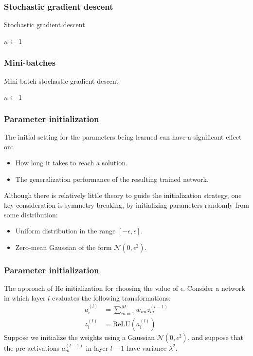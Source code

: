 \documentclass{beamer}
\begin{document}
\begin{frame}
    \frametitle{Stochastic gradient descent}
    \begin{algorithm}[H]
        \caption{Stochastic gradient descent}
        $n\gets{}1$\;
        \;
    \end{algorithm}
\end{frame}

\begin{frame}
    \frametitle{Mini-batches}
    \begin{algorithm}[H]
        \caption{Mini-batch stochastic gradient descent}
        $n\gets{}1$\;
        \;
    \end{algorithm}
\end{frame}

\begin{frame}
    \frametitle{Parameter initialization}
    The initial setting for the parameters being learned can have a significant effect on:
    \begin{itemize}
        \item How long it takes to reach a solution.
        \item The generalization performance of the resulting trained network.
    \end{itemize}
    Although there is relatively little theory to guide the initialization strategy, one key consideration is symmetry breaking, by initializing parameters randomly from some distribution:
    \begin{itemize}
        \item Uniform distribution in the range $[-\epsilon,\epsilon]$.
        \item Zero-mean Gaussian of the form $\mathcal{N}(0,\epsilon^{2})$.
    \end{itemize}
\end{frame}

\begin{frame}
    \frametitle{Parameter initialization}
    The approach of He initialization for choosing the value of $\epsilon$. Consider a network in which layer $l$ evaluates the following transformations:
    \begin{align*}
        a^{(l)}_{i}&=\sum_{m=1}^{M}w_{im}z^{(l-1)}_{m} \\
        z^{(l)}_{i}&=\mathrm{ReLU}(a^{(l)}_{i})
    \end{align*}
    Suppose we initialize the weights using a Gaussian $\mathcal{N}(0,\epsilon^{2})$, and suppose that the pre-activations $a^{(l-1)}_{m}$ in layer $l-1$ have variance $\lambda^{2}$.
\end{frame}
\end{document}
